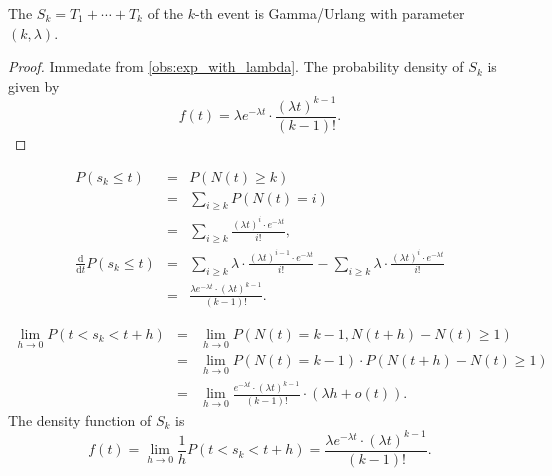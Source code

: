 \begin{observation}
The  $ S_{k} = T_{1} + \cdots + T_{k} $ of the $ k $-th event is Gamma/Urlang with parameter $(k, \lambda) $.
\begin{proof}
Immedate from \autoref{obs:exp_with_lambda}. The probability density of $ S_{k} $ is given by
\[ f(t) = \lambda e^{-\lambda t} \cdot \frac{(\lambda t)^{k - 1}}{(k - 1)!}. \]
\end{proof}

\begin{verification}
\begin{eqnarray*}
P(s_{k} \le t)
  & = & P(N(t) \ge k) \\
  & = & \sum_{i \ge k} P(N(t) = i) \\
  & = & \sum_{i \ge k} \frac{(\lambda t)^{i} \cdot e^{-\lambda t}}{i!}, \\
\frac{\mathrm{d}}{\mathrm{d} t} P(s_{k} \le t)
  & = & \sum_{i \ge k} \lambda \cdot \frac{(\lambda t)^{i - 1} \cdot e^{-\lambda t}}{i!} - \sum_{i \ge k} \lambda \cdot \frac{(\lambda t)^{i} \cdot e^{-\lambda t}}{i!} \\
  & = & \frac{\lambda e^{-\lambda t} \cdot (\lambda t)^{k - 1}}{(k - 1)!}.
\end{eqnarray*}
\end{verification}

\begin{verification}
\begin{eqnarray*}
\lim_{h \to 0} P(t < s_{k} < t + h)
  & = & \lim_{h \to 0} P(N(t) = k - 1, N(t + h) - N(t) \ge 1) \\
  & = & \lim_{h \to 0} P(N(t) = k - 1) \cdot P(N(t + h) - N(t) \ge 1) \\
  & = & \lim_{h \to 0} \frac{e^{-\lambda t} \cdot (\lambda t)^{k - 1}}{(k - 1)!} \cdot (\lambda h + o(t)).
\end{eqnarray*}
The density function of $ S_{k} $ is
\[ f(t) = \lim_{h \to 0} \frac{1}{h} P(t < s_{k} < t + h) = \frac{\lambda e^{-\lambda t} \cdot (\lambda t)^{k - 1}}{(k - 1)!}. \]
\end{verification}
\end{observation}
